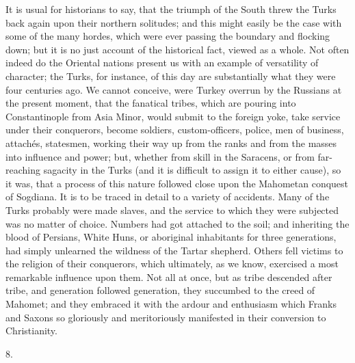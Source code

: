 It is usual for historians to
say, that the triumph of the South threw the Turks back again upon
their northern solitudes; and this might easily be the case with some
of the many hordes, which were ever passing the boundary and flocking
down; but it is no just account of the historical fact, viewed as a
whole. Not often indeed do the Oriental nations present us with an
example of versatility of character; the Turks, for instance, of this
day are substantially what they were four centuries ago. We cannot
conceive, were Turkey overrun by the Russians at the present moment,
that the fanatical tribes, which are pouring into Constantinople from
Asia Minor, would submit to the foreign yoke, take service under
their conquerors, become soldiers, custom-officers, police, men of
business, attachés, statesmen, working their way up from the ranks
and from the masses into influence and power; but, whether from skill
in the Saracens, or from far-reaching sagacity in the Turks (and it is
difficult to assign it to either cause), so it was, that a process of
this nature followed close upon the Mahometan conquest of Sogdiana. It
is to be traced in detail to a variety of accidents. Many of the Turks
probably were made slaves, and the service to which they were
subjected was no matter of choice. Numbers had got attached to the
soil; and inheriting the blood of Persians, White Huns, or aboriginal
inhabitants for three generations, had simply unlearned the wildness
of the Tartar shepherd. Others fell victims to the religion of their
conquerors, which ultimately, as we know, exercised a most remarkable
influence upon them. Not all at once, but as tribe descended after
tribe, and generation followed generation, they succumbed to the creed
of Mahomet; and they embraced it with the ardour and enthusiasm which
Franks and Saxons so gloriously and meritoriously manifested in their
conversion to Christianity.

8.

